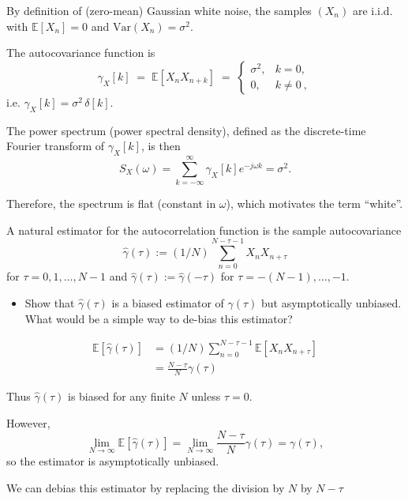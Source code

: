 \documentclass[11pt]{article}
\begin{document}
\begin{solution}
By definition of (zero-mean) Gaussian white noise, the samples $(X_n)$ are i.i.d. with
$\mathbb{E}[X_n] = 0$ and $\mathrm{Var}(X_n)=\sigma^2$.

The autocovariance function is
\[
\gamma_X[k] \;=\; \mathbb{E}[X_n X_{n+k}]
\;=\;
\begin{cases}
\sigma^2, & k = 0,\\
0, & k \neq 0~,
\end{cases}
\]
i.e. $\gamma_X[k] = \sigma^2 \,\delta[k]$.

The power spectrum (power spectral density), defined as the discrete-time Fourier transform of $\gamma_X[k]$, is then
\[
S_X(\omega)
= \sum_{k=-\infty}^{\infty} \gamma_X[k] e^{-j\omega k}
= \sigma^2.
\]

Therefore, the spectrum is flat (constant in $\omega$), which motivates the term ``white''.
\end{solution}



\begin{exercise}
A natural estimator for the autocorrelation function is the sample autocovariance
\begin{equation}
    \hat{\gamma}(\tau) := (1/N) \sum_{n=0}^{N-\tau-1} X_n X_{n+\tau}
\end{equation}
for $\tau=0,1,\dots,N-1$ and $\hat{\gamma}(\tau):=\hat{\gamma}(-\tau)$ for $\tau=-(N-1),\dots,-1$.
\begin{itemize}
    \item Show that $\hat{\gamma}(\tau)$ is a biased estimator of $\gamma(\tau)$ but asymptotically unbiased.
    What would be a simple way to de-bias this estimator?
\end{itemize}

\end{exercise}

\begin{solution}
\begin{equation*}
    \begin{split}
   \mathbb{E}[\hat{\gamma}(\tau)] & = (1/N) \sum_{n=0}^{N-\tau-1} \mathbb{E}[X_n X_{n+\tau}] \\
                                  & =  \frac{N-\tau}{N}\gamma(\tau)
    \end{split}
\end{equation*}

Thus $\hat{\gamma}(\tau)$ is biased for any finite $N$ unless $\tau=0$. 

However,
\[
\lim_{N \to \infty} \mathbb{E}[\hat{\gamma}(\tau)]
= \lim_{N \to \infty} \frac{N-\tau}{N} \gamma(\tau)
= \gamma(\tau),
\]
so the estimator is asymptotically unbiased.

We can debias this estimator by replacing the division by $N$ by $N-\tau$
    

\end{solution}
\end{document}
